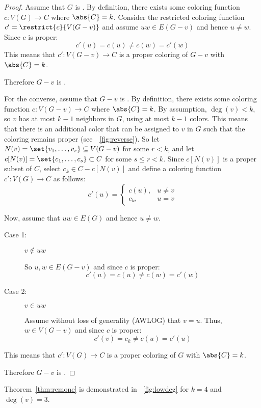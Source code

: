 \begin{proof}
  Assume that \(G\) is .  By definition, there exists some coloring function \(c:V(G)\to C\) where
  \(\abs{C}=k\).  Consider the restricted coloring function \(c'=\restrict{c}{V(G-v)}\) and assume \(uw\in E(G-v)\)
  and hence \(u\ne w\).  Since \(c\) is proper:
  \[c'(u)=c(u)\ne c(w)=c'(w)\]
  This means that \(c':V(G-v)\to C\) is a proper coloring of \(G-v\) with \(\abs{C}=k\).

  Therefore \(G-v\) is .

  For the converse, assume that \(G-v\) is .  By definition, there exists some coloring function
  \(c:V(G-v)\to C\) where \(\abs{C}=k\).  By assumption, \(\deg(v)<k\), so \(v\) has at most \(k-1\) neighbors in
  \(G\), using at most \(k-1\) colors.  This means that there is an additional color that can be assigned to \(v\)
  in \(G\) such that the coloring remains proper (see~\figurename~\ref{fig:reverse}).  So let
  \(N(v)=\set{v_1,\ldots,v_r}\subseteq V(G-v)\) for some \(r<k\), and let \(c[N(v)]=\set{c_1,\ldots,c_s}\subset C\)
  for some \(s\le r<k\).  Since \(c[N(v)]\) is a proper subset of \(C\), select \(c_k\in C-c[N(v)]\) and define a
  coloring function \(c':V(G)\to C\) as follows:
  \[c'(u)=\begin{cases}
  c(u), & u\ne v \\
  c_k, & u=v
  \end{cases}\]

  Now, assume that \(uw\in E(G)\) and hence \(u\ne w\).
  \begin{description}
  \item[Case 1:] \(v\notin uw\)

    So \(u,w\in E(G-v)\) and since \(c\) is proper:
    \[c'(u)=c(u)\ne c(w)=c'(w)\]

  \item[Case 2:] \(v\in uw\)

    Assume without loss of generality (AWLOG) that \(v=u\).  Thus, \(w\in V(G-v)\) and since \(c\) is proper:
    \[c'(v)=c_k\ne c(u)=c'(u)\]
  \end{description}

  This means that \(c':V(G)\to C\) is a proper coloring of \(G\) with \(\abs{C}=k\).

  Therefore \(G-v\) is .
\end{proof}

Theorem~\ref{thm:remone} is demonstrated in \figurename~\ref{fig:lowdeg} for \(k=4\) and \(\deg(v)=3\).

